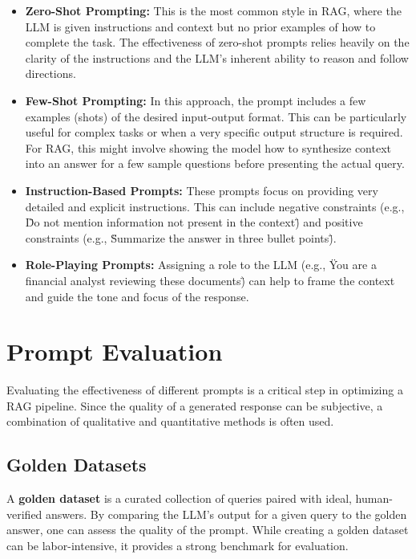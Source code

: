 \begin{itemize}
    \item \textbf{Zero-Shot Prompting:} This is the most common style in RAG, where the LLM is given instructions and context but no prior examples of how to complete the task. The effectiveness of zero-shot prompts relies heavily on the clarity of the instructions and the LLM's inherent ability to reason and follow directions.
    
    \item \textbf{Few-Shot Prompting:} In this approach, the prompt includes a few examples (shots) of the desired input-output format. This can be particularly useful for complex tasks or when a very specific output structure is required. For RAG, this might involve showing the model how to synthesize context into an answer for a few sample questions before presenting the actual query.
    
    \item \textbf{Instruction-Based Prompts:} These prompts focus on providing very detailed and explicit instructions. This can include negative constraints (e.g., \"Do not mention information not present in the context\") and positive constraints (e.g., \"Summarize the answer in three bullet points\").
    
    \item \textbf{Role-Playing Prompts:} Assigning a role to the LLM (e.g., \"You are a financial analyst reviewing these documents\") can help to frame the context and guide the tone and focus of the response.
\end{itemize}

\section{Prompt Evaluation}
Evaluating the effectiveness of different prompts is a critical step in optimizing a RAG pipeline. Since the quality of a generated response can be subjective, a combination of qualitative and quantitative methods is often used.

\subsection{Golden Datasets}
A \textbf{golden dataset} is a curated collection of queries paired with ideal, human-verified answers. By comparing the LLM's output for a given query to the golden answer, one can assess the quality of the prompt. While creating a golden dataset can be labor-intensive, it provides a strong benchmark for evaluation.

